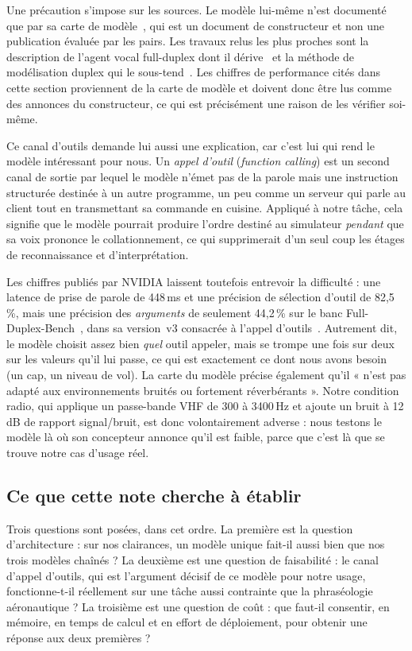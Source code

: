 \documentclass[11pt,a4paper]{article}
\begin{document}
Une précaution s'impose sur les sources. Le modèle lui-même n'est documenté que
par sa carte de modèle~\cite{voicechat11b}, qui est un document de
constructeur et non une publication évaluée par les pairs. Les travaux relus
les plus proches sont la description de l'agent vocal full-duplex dont il
dérive~\cite{casanova2025asru} et la méthode de modélisation duplex qui le
sous-tend~\cite{salmduplex}. Les chiffres de performance cités dans cette
section proviennent de la carte de modèle et doivent donc être lus comme des
annonces du constructeur, ce qui est précisément une raison de les vérifier
soi-même.

Ce canal d'outils demande lui aussi une explication, car c'est lui qui rend le
modèle intéressant pour nous. Un \emph{appel d'outil} (\emph{function calling})
est un second canal de sortie par lequel le modèle n'émet pas de la parole mais
une instruction structurée destinée à un autre programme, un peu comme un
serveur qui parle au client tout en transmettant sa commande en cuisine. Appliqué
à notre tâche, cela signifie que le modèle pourrait produire l'ordre destiné au
simulateur \emph{pendant} que sa voix prononce le collationnement, ce qui
supprimerait d'un seul coup les étages de reconnaissance et d'interprétation.

Les chiffres publiés par NVIDIA laissent toutefois entrevoir la difficulté :
une latence de prise de parole de 448\,ms et une précision de sélection d'outil
de 82,5\,\%, mais une précision des \emph{arguments} de seulement 44,2\,\% sur
le banc Full-Duplex-Bench~\cite{fullduplexbench}, dans sa version~v3 consacrée
à l'appel d'outils~\cite{fullduplexbenchv3}. Autrement dit, le modèle choisit assez bien
\emph{quel} outil appeler, mais se trompe une fois sur deux sur les valeurs
qu'il lui passe, ce qui est exactement ce dont nous avons besoin (un cap, un
niveau de vol). La carte du modèle précise également qu'il « n'est pas adapté
aux environnements bruités ou fortement réverbérants ». Notre condition radio,
qui applique un passe-bande VHF de 300 à 3400\,Hz et ajoute un bruit à 12\,dB de
rapport signal/bruit, est donc volontairement adverse : nous testons le modèle
là où son concepteur annonce qu'il est faible, parce que c'est là que se trouve
notre cas d'usage réel.

\subsection{Ce que cette note cherche à établir}

Trois questions sont posées, dans cet ordre. La première est la question
d'architecture : sur nos clairances, un modèle unique fait-il aussi bien que nos
trois modèles chaînés ? La deuxième est une question de faisabilité : le canal
d'appel d'outils, qui est l'argument décisif de ce modèle pour notre usage,
fonctionne-t-il réellement sur une tâche aussi contrainte que la phraséologie
aéronautique ? La troisième est une question de coût : que faut-il consentir, en
mémoire, en temps de calcul et en effort de déploiement, pour obtenir une
réponse aux deux premières ?
\end{document}
